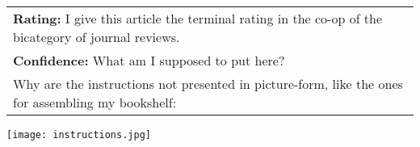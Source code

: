 \documentclass[12pt]{article}
\begin{document}
\begin{tabular}{l}
{\large\bf Rating:} I give this article the terminal rating in the co-op of the bicategory of journal reviews. \\
{\large\bf Confidence:} What am I supposed to put here? \\
	Why are the instructions not presented in picture-form, like the ones for assembling my bookshelf: \\
\end{tabular}
\vspace{-1em}
\begin{center}
	{\texttt{[image: instructions.jpg]}}
\end{center}
\end{document}

